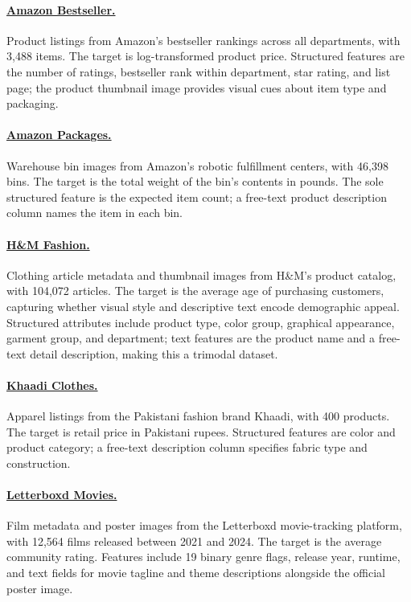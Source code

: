\documentclass{llmxive}
\begin{document}
\paragraph{\href{https://www.kaggle.com/datasets/amankumar20d/amazon-best-seller-all-departments-us}{Amazon Bestseller.}} Product listings from Amazon's bestseller rankings across all departments, with 3,488 items.
The target is log-transformed product price.
Structured features are the number of ratings, bestseller rank within department, star rating, and list page; the product thumbnail image provides visual cues about item type and packaging.

\paragraph{\href{https://www.kaggle.com/datasets/dhruvildave/amazon-bin-image-dataset}{Amazon Packages.}} Warehouse bin images from Amazon's robotic fulfillment centers, with 46,398 bins.
The target is the total weight of the bin's contents in pounds.
The sole structured feature is the expected item count; a free-text product description column names the item in each bin.

\paragraph{\href{https://www.kaggle.com/datasets/odins0n/handm-dataset-128x128}{H\&M Fashion.}} Clothing article metadata and thumbnail images from H\&M's product catalog, with 104,072 articles.
The target is the average age of purchasing customers, capturing whether visual style and descriptive text encode demographic appeal.
Structured attributes include product type, color group, graphical appearance, garment group, and department; text features are the product name and a free-text detail description, making this a trimodal dataset.

\paragraph{\href{https://www.kaggle.com/datasets/usman8/khaadis-clothes-data-with-images}{Khaadi Clothes.}} Apparel listings from the Pakistani fashion brand Khaadi, with 400 products.
The target is retail price in Pakistani rupees.
Structured features are color and product category; a free-text description column specifies fabric type and construction.

\paragraph{\href{https://www.kaggle.com/datasets/gsimonx37/letterboxd}{Letterboxd Movies.}} Film metadata and poster images from the Letterboxd movie-tracking platform, with 12,564 films released between 2021 and 2024.
The target is the average community rating.
Features include 19 binary genre flags, release year, runtime, and text fields for movie tagline and theme descriptions alongside the official poster image.
\end{document}
